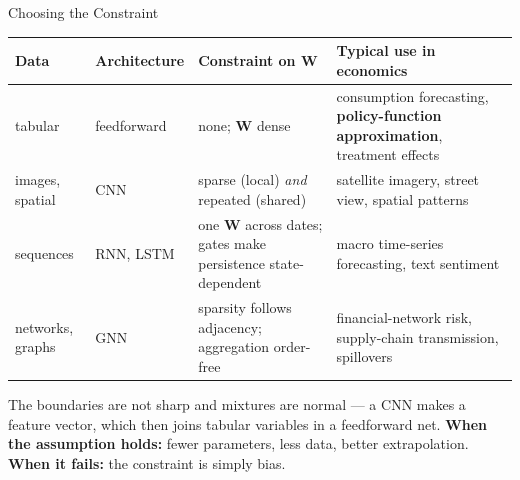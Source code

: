 \begin{frame}{Choosing the Constraint}
\vspace{-1mm}
\begin{center}\footnotesize
\begin{tabularx}{\linewidth}{@{}>{\raggedright\arraybackslash}p{1.65cm} >{\raggedright\arraybackslash}p{2.0cm} >{\raggedright\arraybackslash}X >{\raggedright\arraybackslash}p{3.7cm}@{}}
\toprule
\textbf{Data} & \textbf{Architecture} & \textbf{Constraint on $\mathbf{W}$} & \textbf{Typical use in economics} \\
\midrule
tabular & feedforward & none; $\mathbf{W}$ dense & consumption forecasting, \textbf{policy-function approximation}, treatment effects \\
images, spatial & CNN & sparse (local) \emph{and} repeated (shared) & satellite imagery, street view, spatial patterns \\
sequences & RNN, LSTM & one $\mathbf{W}$ across dates; gates make persistence state-dependent & macro time-series forecasting, text sentiment \\
networks, graphs & GNN & sparsity follows adjacency; aggregation order-free & financial-network risk, supply-chain transmission, spillovers \\
\bottomrule
\end{tabularx}
\end{center}
\vspace{0.5mm}
\begin{cautionbox}\footnotesize
The boundaries are not sharp and mixtures are normal --- a CNN makes a feature vector, which then joins tabular variables in a feedforward net. \textbf{When the assumption holds:} fewer parameters, less data, better extrapolation. \textbf{When it fails:} the constraint is simply bias.
\end{cautionbox}
\vspace{0.5mm}
\end{frame}

